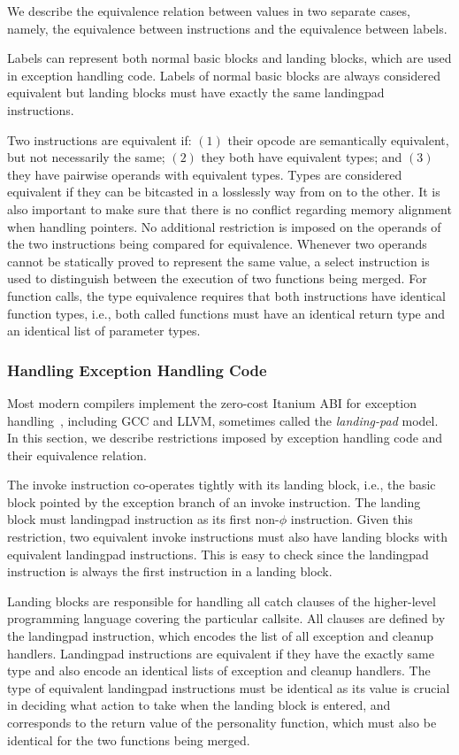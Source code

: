 We describe the equivalence relation between values in two
separate cases, namely, the equivalence between instructions and the
equivalence between labels.

Labels can represent both normal basic blocks and landing blocks, which are used
in exception handling code.
Labels of normal basic blocks are always considered equivalent but
landing blocks must have exactly the same landingpad instructions.

Two instructions are equivalent if: $(1)$ their opcode are semantically
equivalent, but not necessarily the same; $(2)$ they both have equivalent types;
and $(3)$ they have pairwise operands with equivalent types.
Types are considered equivalent if they can be bitcasted in a losslessly way
from on to the other.
It is also important to make sure that there is no conflict regarding memory
alignment when handling pointers.
No additional restriction is imposed on the operands of the two instructions
being compared for equivalence.
Whenever two operands cannot be statically proved to represent the same value,
a select instruction is used to distinguish between the execution of two
functions being merged.
For function calls, the type equivalence requires that both instructions have
identical function types, i.e., both called functions must have an identical
return type and an identical list of parameter types. 

\subsubsection{Handling Exception Handling Code}

Most modern compilers implement the zero-cost Itanium ABI for exception
handling~\cite{dinechin00}, including GCC and LLVM, sometimes called the
\textit{landing-pad} model. In this section, we describe restrictions imposed
by exception handling code and their equivalence relation.

The invoke instruction co-operates tightly with its landing block, i.e., the
basic block pointed by the exception branch of an invoke instruction.
The landing block must landingpad instruction as its first non-$\phi$
instruction.
Given this restriction, two equivalent invoke instructions must also have
landing blocks with equivalent landingpad instructions.
This is easy to check since the landingpad instruction is always the first
instruction in a landing block. 

Landing blocks are responsible for handling all catch clauses of the
higher-level programming language covering the particular callsite.
All clauses are defined by the landingpad instruction, which encodes the list of
all exception and cleanup handlers.
Landingpad instructions are equivalent if they have the exactly same type and
also encode an identical lists of exception and cleanup handlers.
The type of equivalent landingpad instructions must be identical as its value
is crucial in deciding what action to take when the landing block is entered,
and corresponds to the return value of the personality function, which must also
be identical for the two functions being merged.


